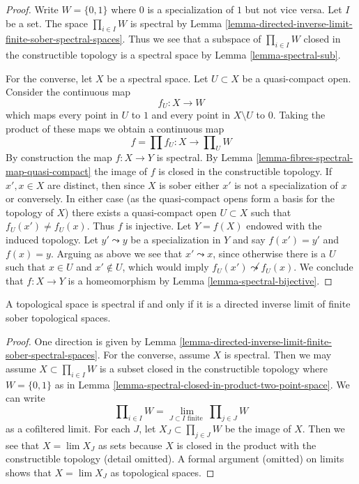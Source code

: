 \begin{proof}
Write $W = \{0, 1\}$ where $0$ is a specialization of $1$ but not vice versa.
Let $I$ be a set. The space $\prod_{i \in I} W$ is spectral by
Lemma \ref{lemma-directed-inverse-limit-finite-sober-spectral-spaces}.
Thus we see that a subspace of $\prod_{i \in I} W$ closed in the
constructible topology is
a spectral space by Lemma \ref{lemma-spectral-sub}.

\medskip\noindent
For the converse, let $X$ be a spectral space. Let $U \subset X$ be a
quasi-compact open. Consider the continuous map
$$
f_U : X \longrightarrow W
$$
which maps every point in $U$ to $1$ and every point in $X \setminus U$ to $0$.
Taking the product of these maps we obtain a continuous map
$$
f = \prod f_U : X \longrightarrow \prod\nolimits_U W
$$
By construction the map $f : X \to Y$ is spectral. By
Lemma \ref{lemma-fibres-spectral-map-quasi-compact}
the image of $f$ is closed in the constructible topology.
If $x', x \in X$ are distinct, then since $X$ is sober either $x'$
is not a specialization of $x$ or conversely. In either case (as the
quasi-compact opens form a basis for the topology of $X$) there
exists a quasi-compact open $U \subset X$ such that $f_U(x') \not = f_U(x)$.
Thus $f$ is injective. Let $Y = f(X)$ endowed with the induced topology.
Let $y' \leadsto y$ be a specialization in $Y$ and say
$f(x') = y'$ and $f(x) = y$. Arguing as above we see that
$x' \leadsto x$, since otherwise there is a $U$ such that
$x \in U$ and $x' \not \in U$, which would imply
$f_U(x') \not \leadsto f_U(x)$.
We conclude that $f : X \to Y$ is a homeomorphism by
Lemma \ref{lemma-spectral-bijective}.
\end{proof}

\begin{lemma}
\label{lemma-spectral-inverse-limit-finite-sober-spaces}
A topological space is spectral if and only if it is a directed
inverse limit of finite sober topological spaces.
\end{lemma}

\begin{proof}
One direction is given by
Lemma \ref{lemma-directed-inverse-limit-finite-sober-spectral-spaces}.
For the converse, assume $X$ is spectral. Then we
may assume $X \subset \prod_{i \in I} W$ is a subset closed
in the constructible topology where $W = \{0, 1\}$ as in
Lemma \ref{lemma-spectral-closed-in-product-two-point-space}.
We can write
$$
\prod\nolimits_{i \in I} W =
\lim_{J \subset I\text{ finite }} \prod\nolimits_{j \in J} W
$$
as a cofiltered limit.
For each $J$, let $X_J \subset \prod_{j \in J} W$ be the image of $X$.
Then we see that $X = \lim X_J$ as sets because $X$ is closed in
the product with the constructible topology (detail omitted).
A formal argument (omitted) on limits shows that $X = \lim X_J$ as topological
spaces.
\end{proof}

